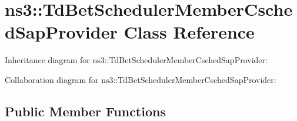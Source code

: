 \hypertarget{classns3_1_1TdBetSchedulerMemberCschedSapProvider}{}\section{ns3\+:\+:Td\+Bet\+Scheduler\+Member\+Csched\+Sap\+Provider Class Reference}
\label{classns3_1_1TdBetSchedulerMemberCschedSapProvider}


Inheritance diagram for ns3\+:\+:Td\+Bet\+Scheduler\+Member\+Csched\+Sap\+Provider\+:


Collaboration diagram for ns3\+:\+:Td\+Bet\+Scheduler\+Member\+Csched\+Sap\+Provider\+:
\subsection*{Public Member Functions}

